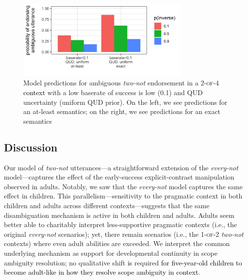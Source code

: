 \documentclass[cm]{glossa}
\newcommand{\gcs}[1]{\textcolor{blue}{[gcs: #1]}}
\newcommand{\lp}[1]{\textcolor{black}{#1}} %
\begin{document}
\begin{figure}[!ht]
\centering
\includegraphics[height=1.55in]{two-not-four.png}
\caption{Model predictions for ambiguous \textit{two-not} endorsement in a \textsc{2-of-4} \lp{context} with a low baserate of success is low (0.1) and QUD uncertainty (uniform QUD prior). On the left, we see predictions for an at-least semantics; on the right, we see predictions for an exact semantics}
\label{fig:2of4}
\end{figure}

\subsection{Discussion}

Our model of \emph{two-not} utterances---a straightforward extension of the \emph{every-not} model---captures the effect of the early-success explicit-contrast manipulation observed in adults. Notably, we saw that the \emph{every-not} model captures the same effect in children. This parallelism---sensitivity to the pragmatic context in both children and adults across different contexts---suggests that the same disambiguation mechanism is active in both children and adults. Adults seem better able to charitably interpret less-supportive pragmatic contexts (i.e., the original \emph{every-not} scenarios); 
yet, there remain scenarios (i.e., the \textsc{1-of-2} \emph{two-not} contexts) %
where even adult abilities are exceeded. We interpret the common underlying mechanism as support for developmental continuity in scope ambiguity resolution;
no qualitative shift \lp{is} required \lp{for five-year-old children to become adult-like in how they resolve scope ambiguity in context}.

\end{document}

